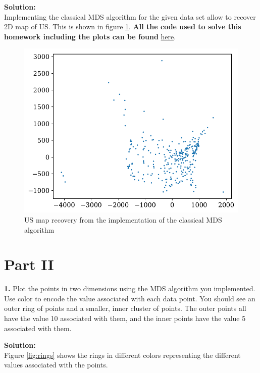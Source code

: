 \documentclass[14pt]{article}
\begin{document}
\textbf{Solution:}\\

Implementing the classical MDS algorithm for the given data set allow
to recover 2D map of US. This is shown in figure \ref{fig:usmap}.
\textbf{All the code used to solve this homework including the plots
can be found} \href{https://nbviewer.jupyter.org/github/jngaravitoc/Lecture_notes_UofA/blob/master/DataScience/HWs/HW3.ipynb}{here}.

\begin{figure}[H]
\centering
\includegraphics[scale=0.5]{usa_map.pdf}
\caption{ US map recovery from the implementation of the classical MDS
algorithm \label{fig:usmap}}
\end{figure}

\section{Part II}

\begin{mdframed}
\textbf{1.} Plot the points in two dimensions using the MDS algorithm you
implemented. Use color to encode the value associated with each data
point. You should see an outer ring of points and a smaller, inner
cluster of points. The outer points all have the value 10 associated
with them, and the inner points have the value 5 associated with them.
\end{mdframed}


\textbf{Solution:}\\

 Figure \ref{fig:rings} shows the rings in different
colors representing the different values associated with the points.
\end{document}
